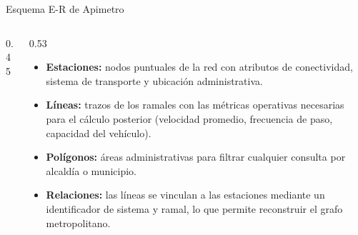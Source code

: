 \begin{frame}{Esquema E-R de Apimetro}
  \begin{columns}[c]
    \begin{column}{0.45\textwidth}
      \centering
      \resizebox{\linewidth}{!}{}
    \end{column}
    \begin{column}{0.53\textwidth}
      \footnotesize
      \vspace*{-0.3cm}
      \begin{itemize}\setlength{\itemsep}{0.05cm}
        \item \textbf{Estaciones:} nodos puntuales de la red con atributos de
              conectividad, sistema de transporte y ubicación administrativa.
        \item \textbf{Líneas:} trazos de los ramales con las métricas operativas
              necesarias para el cálculo posterior (velocidad promedio, frecuencia de paso,
              capacidad del vehículo).
        \item \textbf{Polígonos:} áreas administrativas para filtrar cualquier
              consulta por alcaldía o municipio.
        \item \textbf{Relaciones:} las líneas se vinculan a las estaciones mediante
              un identificador de sistema y ramal, lo que permite reconstruir el grafo
              metropolitano.
      \end{itemize}
    \end{column}
  \end{columns}
\end{frame}

